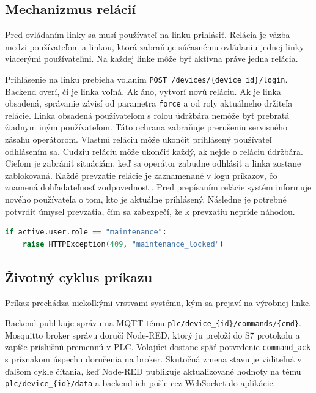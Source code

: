 \subsection{Mechanizmus relácií}
Pred ovládaním linky sa musí používateľ na linku prihlásiť. Relácia
je väzba medzi používateľom a linkou, ktorá zabraňuje súčasnému ovládaniu
jednej linky viacerými používateľmi. Na každej linke môže byť aktívna
práve jedna relácia.

Prihlásenie na linku prebieha volaním \texttt{POST
      /devices/\{device\_id\}/login}. Backend overí, či je linka voľná. Ak áno,
vytvorí novú reláciu. Ak je linka obsadená, správanie závisí od parametra
\texttt{force} a od roly aktuálneho držiteľa relácie. Linka obsadená
používateľom s rolou údržbára nemôže byť prebratá žiadnym iným používateľom.
Táto ochrana zabraňuje prerušeniu servisného zásahu operátorom. Vlastnú reláciu
môže ukončiť prihlásený používateľ odhlásením sa. Cudziu reláciu môže ukončiť
každý, ak nejde o reláciu údržbára. Cieľom je zabrániť
situáciám, keď sa operátor zabudne odhlásiť a linka zostane zablokovaná.
Každé prevzatie relácie je zaznamenané v logu príkazov, čo znamená
dohľadateľnosť zodpovednosti. Pred prepísaním relácie systém informuje nového
používateľa o tom, kto je aktuálne prihlásený. Následne je potrebné potvrdiť
úmysel prevzatia, čím sa zabezpečí, že k prevzatiu nepríde náhodou.

\begin{lstlisting}[style=code-listing, language=Python, caption={Ochrana relácie údržbára}, label={lst:session_protection}]
if active.user.role == "maintenance":
    raise HTTPException(409, "maintenance_locked")
\end{lstlisting}

\subsection{Životný cyklus príkazu}

Príkaz prechádza niekoľkými vrstvami systému, kým sa prejaví na výrobnej linke. 

Backend publikuje správu na MQTT tému
\texttt{plc/device\_\{id\}/commands/\{cmd\}}. Mosquitto broker správu doručí
Node-RED, ktorý ju preloží do S7 protokolu a zapíše príslušnú premennú v PLC.
Volajúci dostane späť potvrdenie \texttt{command\_ack} s príznakom úspechu
doručenia na broker. Skutočná zmena stavu je viditeľná v ďalšom cykle čítania,
keď Node-RED publikuje aktualizované hodnoty na tému
\texttt{plc/device\_\{id\}/data} a backend ich pošle cez WebSocket do
aplikácie.

